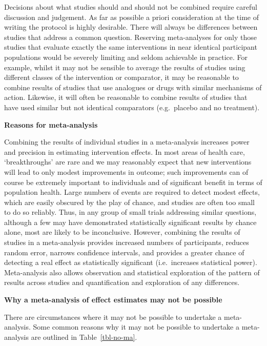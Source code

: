 \documentclass[
  10pt,
  a4paper,
  DIV=11,
  numbers=noendperiod]{scrreprt}
\begin{document}
Decisions about what studies should and should not be combined require
careful discussion and judgement. As far as possible a priori
consideration at the time of writing the protocol is highly desirable.
There will always be differences between studies that address a common
question. Reserving meta-analyses for only those studies that evaluate
exactly the same interventions in near identical participant populations
would be severely limiting and seldom achievable in practice. For
example, whilst it may not be sensible to average the results of studies
using different classes of the intervention or comparator, it may be
reasonable to combine results of studies that use analogues or drugs
with similar mechanisms of action. Likewise, it will often be reasonable
to combine results of studies that have used similar but not identical
comparators (e.g.~placebo and no treatment).

\textbf{Reasons for meta-analysis}

Combining the results of individual studies in a meta-analysis increases
power and precision in estimating intervention effects. In most areas of
health care, `breakthroughs' are rare and we may reasonably expect that
new interventions will lead to only modest improvements in outcome; such
improvements can of course be extremely important to individuals and of
significant benefit in terms of population health. Large numbers of
events are required to detect modest effects, which are easily obscured
by the play of chance, and studies are often too small to do so
reliably. Thus, in any group of small trials addressing similar
questions, although a few may have demonstrated statistically
significant results by chance alone, most are likely to be inconclusive.
However, combining the results of studies in a meta-analysis provides
increased numbers of participants, reduces random error, narrows
confidence intervals, and provides a greater chance of detecting a real
effect as statistically significant (i.e.~increases statistical power).
Meta-analysis also allows observation and statistical exploration of the
pattern of results across studies and quantification and exploration of
any differences.

\textbf{Why a meta-analysis of effect estimates may not be possible}

There are circumstances where it may not be possible to undertake a
meta-analysis. Some common reasons why it may not be possible to
undertake a meta-analysis are outlined in Table~\ref{tbl-no-ma}.
\end{document}
